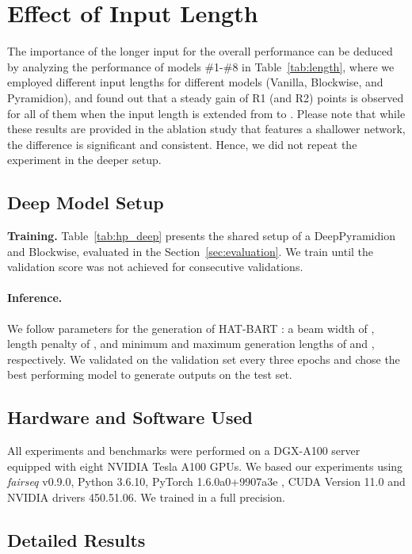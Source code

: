 \documentclass{article}
\begin{document}
\section{Effect of Input Length}
The importance of the longer input for the overall performance can be deduced by analyzing the performance of models \#1-\#8 in Table~\ref{tab:length}, where we employed different input lengths for different models (Vanilla, Blockwise, and Pyramidion), and found out that a steady gain of  R1 (and  R2) points is observed for all of them when the input length is extended from  to . Please note that while these results are provided in the ablation study that features a shallower network, the difference is significant and consistent. Hence, we did not repeat the experiment in the deeper setup.

\subsection{Deep Model Setup}\label{appendix_sub_deeper}
\textbf{Training.}
Table~\ref{tab:hp_deep} presents the shared setup of a DeepPyramidion and Blockwise, evaluated in the Section~\ref{sec:evaluation}. We train until the validation score was not achieved for  consecutive validations.



\paragraph{Inference.}
We follow parameters for the generation of HAT-BART \cite{rohde2021hierarchical}: a beam width of , length penalty of , and minimum and maximum generation lengths of  and , respectively. We validated on the validation set every three epochs and chose the best performing model to generate outputs on the test set. 

\subsection{Hardware and Software Used}\label{appendix_sub_hyperparams}
All experiments and benchmarks were performed on a DGX-A100 server equipped with eight NVIDIA Tesla A100 GPUs. We based our experiments using \textit{fairseq} \citep{ott-etal-2019-fairseq} v0.9.0, Python 3.6.10, PyTorch 1.6.0a0+9907a3e \citep{NEURIPS2019_9015}, CUDA Version 11.0 and NVIDIA drivers 450.51.06. We trained in a full precision. 


\subsection{Detailed Results}
\end{document}
